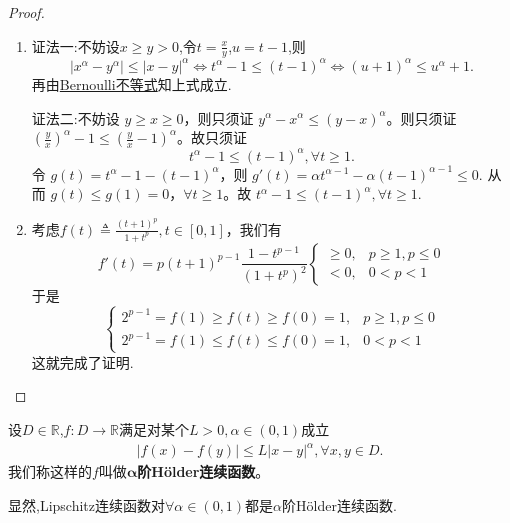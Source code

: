 \documentclass[../../main.tex]{subfiles}%
\begin{document}
\begin{proof}
\begin{enumerate}[(1)]
\item {\color{blue}证法一:}不妨设$x\geqslant y>0$,令$t=\frac{x}{y}$,$u=t-1$,则
\[
\left| x^{\alpha}-y^{\alpha} \right|\leqslant \left| x-y \right|^{\alpha}\Longleftrightarrow t^{\alpha}-1\leqslant \left( t-1 \right)^{\alpha}\Longleftrightarrow \left( u+1 \right)^{\alpha}\leqslant u^{\alpha}+1.
\]
再由\hyperref[theorem:Bernoulli不等式]{Bernoulli不等式}知上式成立.

{\color{blue}证法二:}不妨设 $y \geqslant x \geqslant 0$，则只须证 $y^{\alpha} - x^{\alpha} \leqslant \left( y - x \right)^{\alpha}$。则只须证 $\left( \frac{y}{x} \right)^{\alpha} - 1 \leqslant \left( \frac{y}{x} - 1 \right)^{\alpha}$。故只须证
\[
t^{\alpha} - 1 \leqslant \left( t - 1 \right)^{\alpha}, \forall t \geqslant 1.
\]
令 $g\left( t \right) = t^{\alpha} - 1 - \left( t - 1 \right)^{\alpha}$，则
\(
g'\left( t \right) = \alpha t^{\alpha - 1} - \alpha \left( t - 1 \right)^{\alpha - 1} \leqslant 0.
\)
从而 $g\left( t \right) \leqslant g\left( 1 \right) = 0$，$\forall t \geqslant 1$。故
\(
t^{\alpha} - 1 \leqslant \left( t - 1 \right)^{\alpha},\forall t \geqslant 1.
\)

\item 考虑\(f(t)\triangleq\frac{(t + 1)^p}{1 + t^p},t\in[0,1]\)，我们有
\[
f'(t)=p(t + 1)^{p - 1}\frac{1 - t^{p - 1}}{(1 + t^p)^2}
\begin{cases}
\geqslant0,& p\geqslant1,p\leqslant0\\
<0,& 0 < p < 1
\end{cases}
\]
于是
\[
\begin{cases}
2^{p - 1}=f(1)\geqslant f(t)\geqslant f(0)=1,& p\geqslant1,p\leqslant0\\
2^{p - 1}=f(1)\leqslant f(t)\leqslant f(0)=1,& 0 < p < 1
\end{cases}
\]
这就完成了证明.
\end{enumerate}

\end{proof}

\begin{definition}[Hölder连续]
设$D\in \mathbb{R}$,$f\colon D\to \mathbb{R}$满足对某个$L>0,\alpha\in(0,1)$成立
\begin{align*}
|f(x)-f(y)|\leqslant L|x-y|^\alpha,\forall x,y\in D.
\end{align*}
我们称这样的$f$叫做$\boldsymbol{\alpha}$\textbf{阶Hölder连续函数}。
\end{definition}
\begin{remark}
显然,Lipschitz连续函数对$\forall \alpha \in (0,1)$都是$\alpha$阶Hölder连续函数.
\end{remark}
\end{document}

